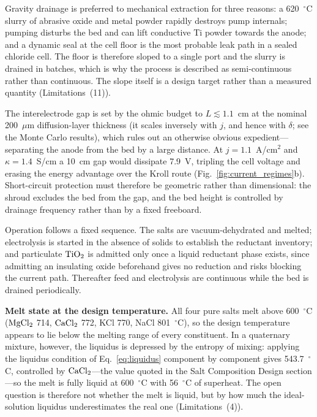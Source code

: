 \documentclass[pdflatex,sn-basic,Numbered]{sn-jnl}
\begin{document}
Gravity drainage is preferred to mechanical extraction for three reasons: a 620~$^{\circ}$C slurry of abrasive oxide and metal powder rapidly destroys pump internals; pumping disturbs the bed and can lift conductive Ti powder towards the anode; and a dynamic seal at the cell floor is the most probable leak path in a sealed chloride cell. The floor is therefore sloped to a single port and the slurry is drained in batches, which is why the process is described as semi-continuous rather than continuous. The slope itself is a design target rather than a measured quantity (Limitations~(11)).

The interelectrode gap is set by the ohmic budget to $L \lesssim 1.1$~cm at the nominal 200~$\mu$m diffusion-layer thickness (it scales inversely with $j$, and hence with $\delta$; see the Monte Carlo results), which rules out an otherwise obvious expedient---separating the anode from the bed by a large distance. At $j = 1.1$~A/cm$^2$ and $\kappa = 1.4$~S/cm a 10~cm gap would dissipate 7.9~V, tripling the cell voltage and erasing the energy advantage over the Kroll route (Fig.~\ref{fig:current_regimes}b). Short-circuit protection must therefore be geometric rather than dimensional: the shroud excludes the bed from the gap, and the bed height is controlled by drainage frequency rather than by a fixed freeboard.

Operation follows a fixed sequence. The salts are vacuum-dehydrated and melted; electrolysis is started in the absence of solids to establish the reductant inventory; and particulate $\ce{TiO2}$ is admitted only once a liquid reductant phase exists, since admitting an insulating oxide beforehand gives no reduction and risks blocking the current path. Thereafter feed and electrolysis are continuous while the bed is drained periodically.

\textbf{Melt state at the design temperature.} All four pure salts melt above 600~$^{\circ}$C ($\ce{MgCl2}$ 714, $\ce{CaCl2}$ 772, KCl 770, NaCl 801~$^{\circ}$C), so the design temperature appears to lie below the melting range of every constituent. In a quaternary mixture, however, the liquidus is depressed by the entropy of mixing: applying the liquidus condition of Eq.~\ref{eq:liquidus} component by component gives 543.7~$^{\circ}$C, controlled by $\ce{CaCl2}$---the value quoted in the Salt Composition Design section---so the melt is fully liquid at 600~$^{\circ}$C with 56~$^{\circ}$C of superheat. The open question is therefore not whether the melt is liquid, but by how much the ideal-solution liquidus underestimates the real one (Limitations~(4)).
\end{document}

